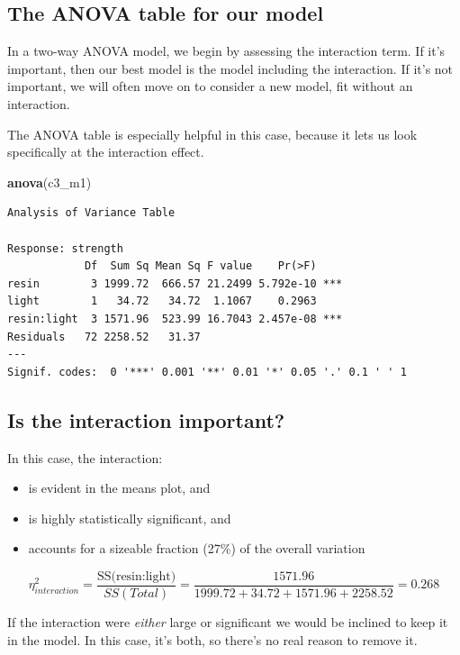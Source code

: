 \documentclass[]{book}
\newenvironment{Shaded}{\begin{snugshade}}{\end{snugshade}}
\newcommand{\KeywordTok}[1]{\textcolor[rgb]{0.13,0.29,0.53}{\textbf{#1}}}
\newcommand{\NormalTok}[1]{#1}
\providecommand{\tightlist}{%
  \setlength{\itemsep}{0pt}\setlength{\parskip}{0pt}}
\theoremstyle{definition}
\theoremstyle{definition}
\theoremstyle{definition}
\theoremstyle{remark}
\begin{document}
\subsection{The ANOVA table for our
model}\label{the-anova-table-for-our-model}

In a two-way ANOVA model, we begin by assessing the interaction term. If
it's important, then our best model is the model including the
interaction. If it's not important, we will often move on to consider a
new model, fit without an interaction.

The ANOVA table is especially helpful in this case, because it lets us
look specifically at the interaction effect.

\begin{Shaded}
\begin{Highlighting}[]
\KeywordTok{anova}\NormalTok{(c3_m1)}
\end{Highlighting}
\end{Shaded}

\begin{verbatim}
Analysis of Variance Table

Response: strength
            Df  Sum Sq Mean Sq F value    Pr(>F)    
resin        3 1999.72  666.57 21.2499 5.792e-10 ***
light        1   34.72   34.72  1.1067    0.2963    
resin:light  3 1571.96  523.99 16.7043 2.457e-08 ***
Residuals   72 2258.52   31.37                      
---
Signif. codes:  0 '***' 0.001 '**' 0.01 '*' 0.05 '.' 0.1 ' ' 1
\end{verbatim}

\subsection{Is the interaction
important?}\label{is-the-interaction-important}

In this case, the interaction:

\begin{itemize}
\tightlist
\item
  is evident in the means plot, and
\item
  is highly statistically significant, and
\item
  accounts for a sizeable fraction (27\%) of the overall variation
\end{itemize}

\[ 
\eta^2_{interaction} = \frac{\mbox{SS(resin:light)}}{SS(Total)}
= \frac{1571.96}{1999.72 + 34.72 + 1571.96 + 2258.52} = 0.268
\]

If the interaction were \emph{either} large or significant we would be
inclined to keep it in the model. In this case, it's both, so there's no
real reason to remove it.
\end{document}
